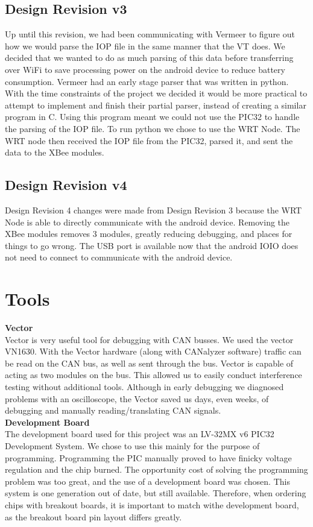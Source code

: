 \documentclass[paper=a4, fontsize=11pt]{scrartcl}
\numberwithin{equation}{section}		%
\numberwithin{figure}{section}			%
\numberwithin{table}{section}				%
\begin{document}
\subsection{Design Revision v3} 
Up until this revision, we had been communicating with Vermeer to figure out how we would parse the IOP file in the same manner that the VT does. We decided that we wanted to do as much parsing of this data before transferring over WiFi to save processing power on the android device to reduce battery consumption. Vermeer had an early stage parser that was written in python. With the time constraints of the project we decided it would be more practical to attempt to implement and finish their partial parser, instead of creating a similar program in C. Using this program meant we could not use the PIC32 to handle the parsing of the IOP file. To run python we chose to use the WRT Node. The WRT node then received the IOP file from the PIC32, parsed it, and sent the data to the XBee modules. \\

\subsection{Design Revision v4} 
Design Revision 4 changes were made from Design Revision 3 because the WRT Node is able to directly communicate with the android device. Removing the XBee modules removes 3 modules, greatly reducing debugging, and places for things to go wrong. The USB port is available now that the android IOIO does not need to connect to communicate with the android device.\\

\section{Tools}
\textbf{Vector}\\
Vector is very useful tool for debugging with CAN busses. We used the vector VN1630. With the Vector hardware (along with CANalyzer software) traffic can be read on the CAN bus, as well as sent through the bus. Vector is capable of acting as two modules on the bus. This allowed us to easily conduct interference testing without additional tools. Although in early debugging we diagnosed problems with an oscilloscope, the Vector saved us days, even weeks, of debugging and manually reading/translating CAN signals.\\

\textbf{Development Board}\\
The development board used for this project was an LV-32MX v6 PIC32 Development System. We chose to use this mainly for the purpose of programming. Programming the PIC manually proved to have finicky voltage regulation and the chip burned. The opportunity cost of solving the programming problem was too great, and the use of a development board was chosen. This system is one generation out of date, but still available. Therefore, when ordering chips with breakout boards, it is important to match withe development board, as the breakout board pin layout differs greatly.\\
\end{document}
